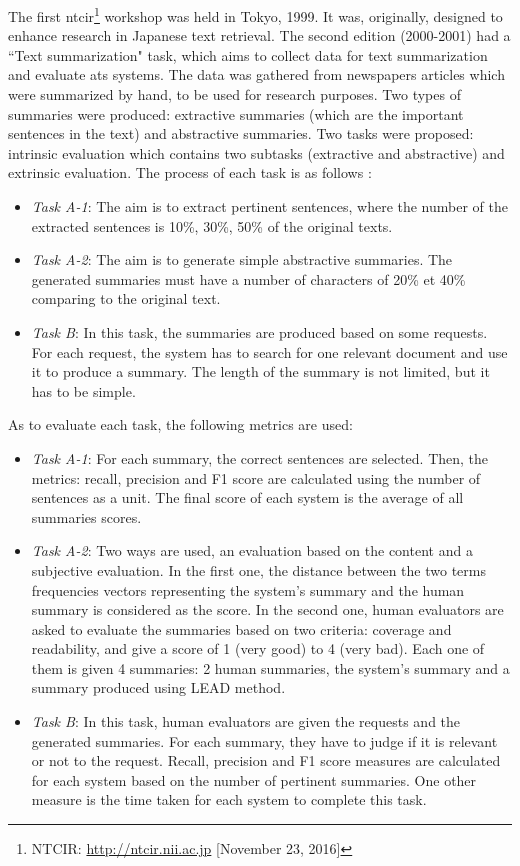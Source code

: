 The first \ac{ntcir}\footnote{NTCIR: \url{http://ntcir.nii.ac.jp} [November 23, 2016]} workshop was held in Tokyo, 1999. 
It was, originally, designed to enhance research in Japanese text retrieval. %
The second edition (2000-2001) had a ``Text summarization" task, which aims to collect data for text summarization and evaluate \ac{ats} systems.
The data was gathered from newspapers articles which were summarized by hand, to be used for research purposes. 
Two types of summaries were produced: extractive summaries (which are the important sentences in the text) and abstractive summaries.
Two tasks were proposed: intrinsic evaluation which contains two subtasks (extractive and abstractive) and extrinsic evaluation.
The process of each task is as follows \citep{01-fukusima-okumura}:
\begin{itemize}
	\item \textit{Task A-1}: The aim is to extract pertinent sentences, where the number of the extracted sentences is  10\%, 30\%, 50\% of the original texts.
	
	\item \textit{Task A-2}: The aim is to generate simple abstractive summaries.
	The generated summaries must have a number of characters of 20\% et 40\% comparing to the original text.
	
	\item \textit{Task B}: In this task, the summaries are produced based on some requests. 
	For each request, the system has to search for one relevant document and use it to produce a summary. 
	The length of the summary is not limited, but it has to be simple.
\end{itemize}
As to evaluate each task, the following metrics are used:
\begin{itemize}
	\item \textit{Task A-1}: For each summary, the correct sentences are selected. 
	Then, the metrics: recall, precision and F1 score are calculated using the number of sentences as a unit.
	The final score of each system is the average of all summaries scores. 
	
	\item \textit{Task A-2}: Two ways are used, an evaluation based on the content and a subjective evaluation.
	In the first one, the distance between the two terms frequencies vectors representing the system's summary and the human summary is considered as the score.
	In the second one, human evaluators are asked to evaluate the summaries based on two criteria: coverage and readability, and give a score of 1 (very good) to 4 (very bad).
	Each one of them is given 4 summaries: 2 human summaries, the system's summary and a summary produced using LEAD method.
	
	\item \textit{Task B}: In this task, human evaluators are given the requests and the generated summaries.
	For each summary, they have to judge if it is relevant or not to the request.
	Recall, precision and F1 score measures are calculated for each system based on the number of pertinent summaries.
	One other measure is the time taken for each system to complete this task.
\end{itemize}


